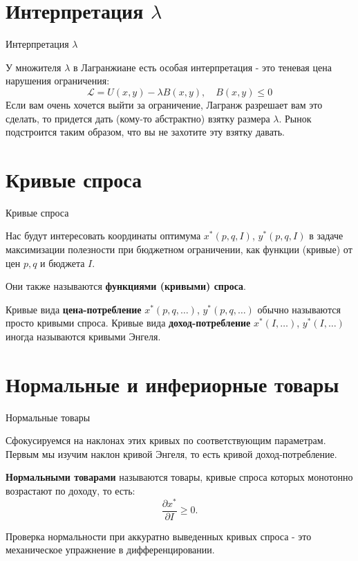 \documentclass{beamer}
\begin{document}
\section{Интерпретация $\lambda$}

\begin{frame}{Интерпретация $\lambda$}

У множителя $\lambda$ в Лагранжиане есть особая интерпретация - это теневая цена нарушения ограничения:
$$\mathcal{L} = U(x,y) - \lambda B(x,y), \quad B(x,y) \leqslant 0$$ 
Если вам очень хочется выйти за ограничение, Лагранж разрешает вам это сделать, то придется дать (кому-то абстрактно) взятку размера $\lambda$. Рынок подстроится таким образом, что вы не захотите эту взятку давать. 

\end{frame}

\section{Кривые спроса}

\begin{frame}{Кривые спроса}

Нас будут интересовать координаты оптимума $x^{\ast}(p,q,I)$, $y^{\ast}(p,q,I)$ в задаче максимизации полезности при бюджетном ограничении, как функции (кривые) от цен $p,q$ и бюджета $I$. 

Они также называются \textbf{функциями (кривыми) спроса}.

\begin{definition}
Кривые вида \textbf{цена-потребление} $x^{\ast}(p,q, \ldots)$, $y^{\ast}(p,q, \ldots)$ обычно называются просто кривыми спроса. Кривые вида \textbf{доход-потребление} $x^{\ast}(I, \ldots)$, $y^{\ast}(I, \ldots)$ иногда называются кривыми Энгеля.
\end{definition}

\end{frame}

\section{Нормальные и инфериорные товары}

\begin{frame}{Нормальные товары}

Сфокусируемся на наклонах этих кривых по соответствующим параметрам. Первым мы изучим наклон кривой Энгеля, то есть кривой доход-потребление.

\begin{definition}
\textbf{Нормальными товарами} называются товары, кривые спроса которых монотонно возрастают по доходу, то есть:
$$\frac{\partial x^{\ast}}{\partial I} \geqslant 0.$$
\end{definition}
Проверка нормальности при аккуратно выведенных кривых спроса - это механическое упражнение в дифференцировании.  

\end{frame}
\end{document}
